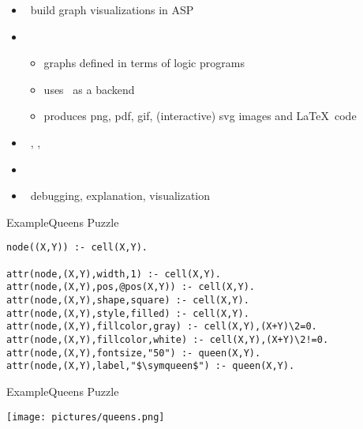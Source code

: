 \begin{frame}{\clingraph}
  \begin{itemize}
    \item {} \ build graph visualizations in ASP
    \item {}
      \begin{itemize}
      \item graphs defined in terms of logic programs %
      \item uses \graphviz\ as a backend
      \item produces png, pdf, gif, (interactive) svg images and \LaTeX\ code
      \end{itemize}
    \item {}   \ \clingo, \clorm, \graphviz
    \item {}   \ \cite{hasascst22a}
    \item {} \ debugging, explanation, visualization %
  \end{itemize}
\end{frame}


\begin{frame}[fragile]{Example}{Queens Puzzle}
  \begin{adjustbox}{max totalsize={\textwidth}{.7\textheight},keepaspectratio}
    \begin{lstlisting}[]
node((X,Y)) :- cell(X,Y).

attr(node,(X,Y),width,1) :- cell(X,Y).
attr(node,(X,Y),pos,@pos(X,Y)) :- cell(X,Y).
attr(node,(X,Y),shape,square) :- cell(X,Y).
attr(node,(X,Y),style,filled) :- cell(X,Y).
attr(node,(X,Y),fillcolor,gray) :- cell(X,Y),(X+Y)\2=0.
attr(node,(X,Y),fillcolor,white) :- cell(X,Y),(X+Y)\2!=0.
attr(node,(X,Y),fontsize,"50") :- queen(X,Y).
attr(node,(X,Y),label,"$\symqueen$") :- queen(X,Y).
  \end{lstlisting}
  \end{adjustbox}

\end{frame}
  \begin{frame}[fragile]{Example}{Queens Puzzle}

  \texttt{[image: pictures/queens.png]}
  \end{frame}

%

